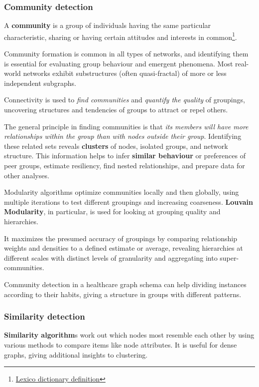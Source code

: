 \subsubsection{Community detection}
A \textbf{community} is a group of individuals having the same particular characteristic, sharing or having certain attitudes and interests in common\footnote{\href{https://www.lexico.com/en/definition/community}{Lexico dictionary definition}}.

Community formation is common in all types of networks, and identifying them is essential for evaluating group behaviour and emergent phenomena. Most real-world networks exhibit substructures (often quasi-fractal) of more or less independent subgraphs.

Connectivity is used to \textit{find communities} and \textit{quantify the quality} of groupings, uncovering structures and tendencies of groups to attract or repel others.

The general principle in finding communities is that \textit{its members will have more relationships within the group than with nodes outside their group}. Identifying these related sets reveals \textbf{clusters} of nodes, isolated groups, and network structure. This information helps to infer \textbf{similar behaviour} or preferences of peer groups, estimate resiliency, find nested relationships, and prepare data for other analyses.

Modularity algorithms optimize communities locally and then globally, using multiple iterations to test different groupings and increasing coarseness. \textbf{Louvain Modularity}, in particular, is used for looking at grouping quality and hierarchies.

It maximizes the presumed accuracy of groupings by comparing relationship weights and densities to a defined estimate or average, revealing hierarchies at different scales with distinct levels of granularity and aggregating into super-communities.

Community detection in a healthcare graph schema can help dividing instances according to their habits, giving a structure in groups with different patterns.

\subsubsection{Similarity detection}
\textbf{Similarity algorithm}s work out which nodes most resemble each other by using various methods to compare items like node attributes. It is useful for dense graphs, giving additional insights to clustering.

